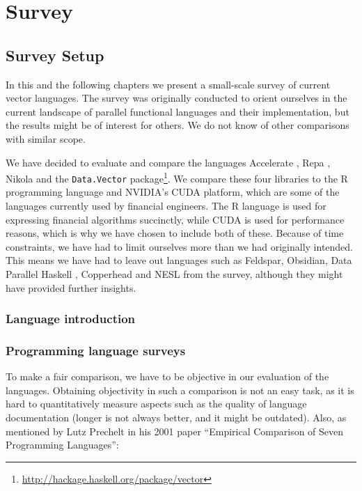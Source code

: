 \part{Survey}
\chapter{Survey Setup}
In this and the following chapters we present a small-scale survey of
current vector languages. The survey was originally conducted to
orient ourselves in the current landscape of parallel functional
languages and their implementation, but the results might be of
interest for others. We do not know of other comparisons with similar
scope.

We have decided to evaluate and compare the languages Accelerate
\cite{chakravarty2011accelerating}, Repa \cite{keller2010regular},
Nikola \cite{mainland2010nikola} and the \texttt{Data.Vector}
package\footnote{\url{http://hackage.haskell.org/package/vector}}. We
compare these four libraries to the R programming language and NVIDIA's
CUDA platform, which are some of the languages currently used by
financial engineers. The R language is used for expressing financial
algorithms succinctly, while CUDA is used for performance reasons,
which is why we have chosen to include both of these. Because of time
constraints, we have had to limit ourselves more than we had originally
intended. This means we have had to leave out languages such as
Feldspar\cite{axelsson2010feldspar},
Obsidian\cite{svensson2011obsidian}, Data Parallel Haskell \cite{},
Copperhead\cite{Catanzaro2011} and NESL\cite{nesl} from the survey,
although they might have provided further insights.


\section{Language introduction}

\section{Programming language surveys}
To make a fair comparison, we have to be objective in our evaluation
of the languages. Obtaining objectivity in such a comparison is not
an easy task, as it is hard to quantitatively measure aspects such as
the quality of language documentation (longer is not always better,
and it might be outdated). Also, as mentioned by Lutz Prechelt in his
2001 paper ``Empirical Comparison of Seven Programming Languages'':

